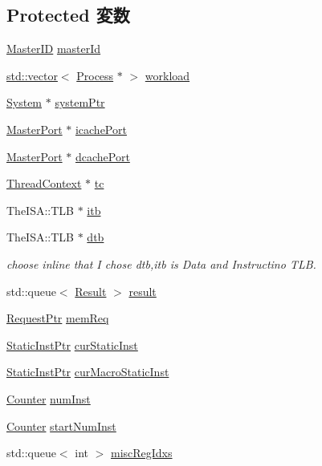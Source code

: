 \subsection*{Protected 変数}
\begin{DoxyCompactItemize}
\item 
\hyperlink{request_8hh_ac366b729262fd8e7cbd3283da6f775cf}{MasterID} \hyperlink{classCheckerCPU_a96ec6a422ac492d05f8b3edc5b58532b}{masterId}
\item 
\hyperlink{classstd_1_1vector}{std::vector}$<$ \hyperlink{classProcess}{Process} $\ast$ $>$ \hyperlink{classCheckerCPU_a9b2cb3a230c37a5bb09eca1375e1a5bf}{workload}
\item 
\hyperlink{classSystem}{System} $\ast$ \hyperlink{classCheckerCPU_a200e57ff6183b27a87839eda56674e28}{systemPtr}
\item 
\hyperlink{classMasterPort}{MasterPort} $\ast$ \hyperlink{classCheckerCPU_ad3e6f54baa0db8d477f7d4fe986dbc3c}{icachePort}
\item 
\hyperlink{classMasterPort}{MasterPort} $\ast$ \hyperlink{classCheckerCPU_a2bbddd281625b8b4d716708925673445}{dcachePort}
\item 
\hyperlink{classThreadContext}{ThreadContext} $\ast$ \hyperlink{classCheckerCPU_a4455a4759e69e5ebe68ae7298cbcc37d}{tc}
\item 
TheISA::TLB $\ast$ \hyperlink{classCheckerCPU_abcb37ddc11515555d8484702697bc4bb}{itb}
\item 
TheISA::TLB $\ast$ \hyperlink{classCheckerCPU_ad2fd039621f87592c4b344d4f8948e78}{dtb}
\begin{DoxyCompactList}\small\item\em choose inline that I chose dtb,itb is Data and Instructino TLB. \item\end{DoxyCompactList}\item 
std::queue$<$ \hyperlink{unionCheckerCPU_1_1Result}{Result} $>$ \hyperlink{classCheckerCPU_a54109cef8003daf3b366cc9890001d80}{result}
\item 
\hyperlink{classRequest}{RequestPtr} \hyperlink{classCheckerCPU_a5520eb2f7c2cf4b0e109d6ffd6d2d053}{memReq}
\item 
\hyperlink{classRefCountingPtr}{StaticInstPtr} \hyperlink{classCheckerCPU_abd80e0d70258dae9a743c9930a385163}{curStaticInst}
\item 
\hyperlink{classRefCountingPtr}{StaticInstPtr} \hyperlink{classCheckerCPU_a52d6d2514fb5ccecad4788d57738f544}{curMacroStaticInst}
\item 
\hyperlink{base_2types_8hh_ae1475755791765b8e6f6a8bb091e273e}{Counter} \hyperlink{classCheckerCPU_a1431f3f73435dd9b1c68e7e3a303ada0}{numInst}
\item 
\hyperlink{base_2types_8hh_ae1475755791765b8e6f6a8bb091e273e}{Counter} \hyperlink{classCheckerCPU_add074e8bdc5b62781b8ef02d666dc6b1}{startNumInst}
\item 
std::queue$<$ int $>$ \hyperlink{classCheckerCPU_a7abed4832bdda0e4a4770ac6946d9e24}{miscRegIdxs}
\end{DoxyCompactItemize}


